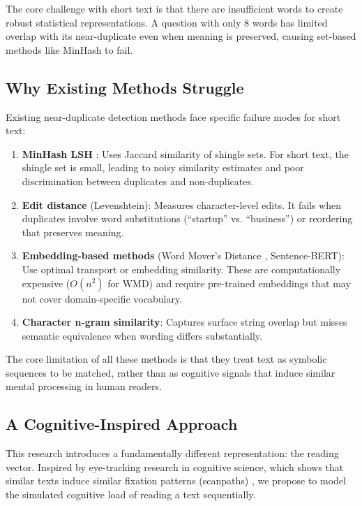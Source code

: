 \documentclass[11pt,letterpaper]{article}
\begin{document}
The core challenge with short text is that there are insufficient words to create robust statistical representations. A question with only 8 words has limited overlap with its near-duplicate even when meaning is preserved, causing set-based methods like MinHash to fail.

\subsection{Why Existing Methods Struggle}

Existing near-duplicate detection methods face specific failure modes for short text:

\begin{enumerate}
\item \textbf{MinHash LSH} \cite{Broder1997, Manku2007}: Uses Jaccard similarity of shingle sets. For short text, the shingle set is small, leading to noisy similarity estimates and poor discrimination between duplicates and non-duplicates.

\item \textbf{Edit distance} (Levenshtein): Measures character-level edits. It fails when duplicates involve word substitutions (``startup'' vs. ``business'') or reordering that preserves meaning.

\item \textbf{Embedding-based methods} (Word Mover's Distance \cite{Kusner2015}, Sentence-BERT): Use optimal transport or embedding similarity. These are computationally expensive ($O(n^2)$ for WMD) and require pre-trained embeddings that may not cover domain-specific vocabulary.

\item \textbf{Character n-gram similarity}: Captures surface string overlap but misses semantic equivalence when wording differs substantially.
\end{enumerate}

The core limitation of all these methods is that they treat text as symbolic sequences to be matched, rather than as cognitive signals that induce similar mental processing in human readers.

\subsection{A Cognitive-Inspired Approach}

This research introduces a fundamentally different representation: the reading vector. Inspired by eye-tracking research in cognitive science, which shows that similar texts induce similar fixation patterns (scanpaths) \cite{Rayner1998}, we propose to model the simulated cognitive load of reading a text sequentially.
\end{document}
